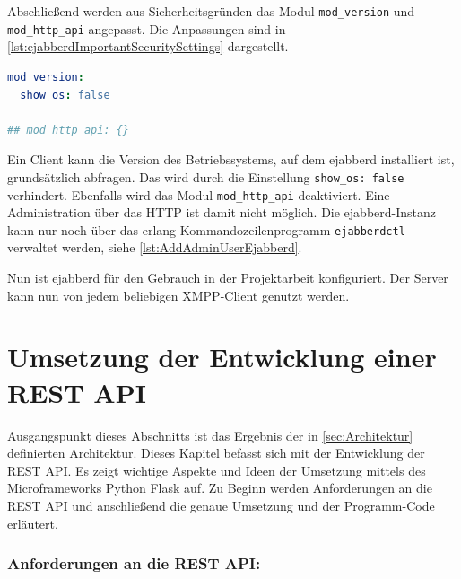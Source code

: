 \documentclass[a4paper,titlepage,halfparskip,12pt]{scrreprt}
\begin{document}
\begin{onehalfspacing}
Abschließend werden aus Sicherheitsgründen das Modul \texttt{mod\_version} und \texttt{mod\_http\_api} angepasst. Die Anpassungen sind in \autoref{lst:ejabberdImportantSecuritySettings} dargestellt.

\begin{lstlisting}[language=yaml, caption={Konfiguration relevanter Module für die Sicherheit von ejabberd},label={lst:ejabberdImportantSecuritySettings}]
mod_version: 
  show_os: false

## mod_http_api: {}
\end{lstlisting}

Ein Client kann die Version des Betriebssystems, auf dem ejabberd installiert ist, grundsätzlich abfragen. Das wird durch die Einstellung \texttt{show\_os: false} verhindert. Ebenfalls wird das Modul \texttt{mod\_http\_api} deaktiviert. Eine Administration über das \ac{HTTP} ist damit nicht möglich. Die ejabberd-Instanz kann nur noch über das erlang Kommandozeilenprogramm \texttt{ejabberdctl} verwaltet werden, siehe \autoref{lst:AddAdminUserEjabberd}.

Nun ist ejabberd für den Gebrauch in der Projektarbeit konfiguriert. Der Server kann nun von jedem beliebigen \ac{XMPP}-Client genutzt werden.

\newpage

\section{Umsetzung der Entwicklung einer \acs{REST} \acs{API}}
\label{subsec:Backend}

Ausgangspunkt dieses Abschnitts ist das Ergebnis der in \autoref{sec:Architektur} definierten Architektur. Dieses Kapitel befasst sich mit der Entwicklung der \acs{REST} \acs{API}. Es zeigt wichtige Aspekte und Ideen der Umsetzung mittels des Microframeworks Python Flask auf. Zu Beginn werden Anforderungen an die \acs{REST} \acs{API} und anschließend die genaue Umsetzung und der Programm-Code erläutert.

\subsubsection*{Anforderungen an die \acs{REST} \acs{API}:}


\end{onehalfspacing}
\end{document}

